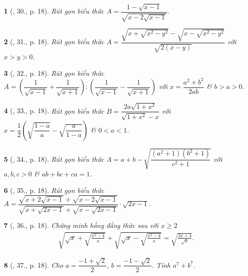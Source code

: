 \documentclass{article}
\newtheorem{baitoan}{}
\begin{document}
\begin{baitoan}[\cite{Binh_Toan_9_tap_1}, 30., p. 18]
	Rút gọn biểu thức $A = \dfrac{1 - \sqrt{x - 1}}{\sqrt{x - 2\sqrt{x - 1}}}$.
\end{baitoan}

\begin{baitoan}[\cite{Binh_Toan_9_tap_1}, 31., p. 18]
	Rút gọn biểu thức $A = \dfrac{\sqrt{x + \sqrt{x^2 - y^2}} - \sqrt{x - \sqrt{x^2 - y^2}}}{\sqrt{2(x - y)}}$ với $x > y > 0$.
\end{baitoan}

\begin{baitoan}[\cite{Binh_Toan_9_tap_1}, 32., p. 18]
	Rút gọn biểu thức $A = \left(\dfrac{1}{\sqrt{x - 1}} + \dfrac{1}{\sqrt{x + 1}}\right):\left(\dfrac{1}{\sqrt{x - 1}} - \dfrac{1}{\sqrt{x + 1}}\right)$ với $x = \dfrac{a^2 + b^2}{2ab}$ \& $b > a > 0$.
\end{baitoan}

\begin{baitoan}[\cite{Binh_Toan_9_tap_1}, 33., p. 18]
	Rút gọn biểu thức $B = \dfrac{2a\sqrt{1 + x^2}}{\sqrt{1 + x^2} - x}$ với $x = \dfrac{1}{2}\left(\sqrt{\dfrac{1 - a}{a}} - \sqrt{\dfrac{a}{1 - a}}\right)$ \& $0 < a < 1$.
\end{baitoan}

\begin{baitoan}[\cite{Binh_Toan_9_tap_1}, 34., p. 18]
	Rút gọn biểu thức $A = a + b - \sqrt{\dfrac{(a^2 + 1)(b^2 + 1)}{c^2 + 1}}$ với $a,b,c > 0$ \& $ab + bc + ca = 1$.
\end{baitoan}

\begin{baitoan}[\cite{Binh_Toan_9_tap_1}, 35., p. 18]
	Rút gọn biểu thức $A = \dfrac{\sqrt{x + 2\sqrt{x - 1}} + \sqrt{x - 2\sqrt{x - 1}}}{\sqrt{x + \sqrt{2x - 1}} + \sqrt{x - \sqrt{2x - 1}}}\cdot\sqrt{2x - 1}$.
\end{baitoan}

\begin{baitoan}[\cite{Binh_Toan_9_tap_1}, 36., p. 18]
	Chứng minh hằng đẳng thức sau với $x\ge2$
	\begin{align*}
		\sqrt{\sqrt{x} + \sqrt{\frac{x^2 - 4}{x}}} + \sqrt{\sqrt{x} - \sqrt{\frac{x^2 - 4}{x}}} = \sqrt{\frac{2x + 4}{\sqrt{x}}}.
	\end{align*}
\end{baitoan}

\begin{baitoan}[\cite{Binh_Toan_9_tap_1}, 37., p. 18]
	Cho $a = \dfrac{-1 + \sqrt{2}}{2}$, $b = \dfrac{-1 - \sqrt{2}}{2}$. Tính $a^7 + b^7$.
\end{baitoan}
\end{document}
